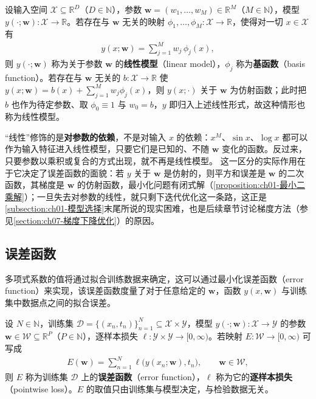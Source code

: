 \documentclass[../../main.tex]{subfiles}
\begin{document}
\begin{definition}[线性模型]\label{definition:ch01-线性模型}
设输入空间 $\mathcal{X}\subseteq\mathbb{R}^{D}$（$D\in\mathbb{N}$），参数 $\mathbf{w}=(w_1,\dots,w_{M})\in\mathbb{R}^{M}$（$M\in\mathbb{N}$），模型 $y(\cdot;\mathbf{w}):\mathcal{X}\to\mathbb{R}$。若存在与 $\mathbf{w}$ 无关的映射 $\phi_1,\dots,\phi_{M}:\mathcal{X}\to\mathbb{R}$，使得对一切 $x\in\mathcal{X}$ 有
\begin{align*}
  y(x;\mathbf{w})=\sum_{j=1}^{M}w_j\,\phi_j(x),
\end{align*}
则 $y(\cdot;\mathbf{w})$ 称为关于参数 $\mathbf{w}$ 的\textbf{线性模型}（linear model），$\phi_j$ 称为\textbf{基函数}（basis function）。若存在与 $\mathbf{w}$ 无关的 $b:\mathcal{X}\to\mathbb{R}$ 使 $y(x;\mathbf{w})=b(x)+\sum_{j=1}^{M}w_j\phi_j(x)$，则 $y(x;\cdot)$ 关于 $\mathbf{w}$ 为仿射函数；此时把 $b$ 也作为待定参数、取 $\phi_0\equiv1$ 与 $w_0=b$，$y$ 即归入上述线性形式，故这种情形也称为线性模型。
\end{definition}

\begin{remark}
“线性”修饰的是\textbf{对参数的依赖}，不是对输入 $x$ 的依赖：$x^M$、$\sin x$、$\log x$ 都可以作为输入特征进入线性模型，只要它们是已知的、不随 $\mathbf{w}$ 变化的函数。反过来，只要参数以乘积或复合的方式出现，就不再是线性模型。
这一区分的实际作用在于它决定了误差函数的面貌：若 $y$ 关于 $\mathbf{w}$ 是仿射的，则平方和误差是 $\mathbf{w}$ 的二次函数，其梯度是 $\mathbf{w}$ 的仿射函数，最小化问题有闭式解（\cref{proposition:ch01-最小二乘解}）；一旦失去对参数的线性，就只剩下迭代优化这一条路，这正是\cref{subsection:ch01-模型选择}末尾所说的现实困难，也是后续章节讨论梯度方法（参见\cref{section:ch07-梯度下降优化}）的原因。
\end{remark}

\subsection{误差函数}\label{subsection:ch01-误差函数}

多项式系数的值将通过拟合训练数据来确定，这可以通过最小化误差函数（error function）来实现，该误差函数度量了对于任意给定的 $\mathbf{w}$，函数 $y(x,\mathbf{w})$ 与训练集中数据点之间的拟合误差。

\begin{definition}[误差函数]\label{definition:ch01-误差函数}
设 $N\in\mathbb{N}$，训练集 $\mathcal{D}=\{(x_n,t_n)\}_{n=1}^{N}\subseteq\mathcal{X}\times\mathcal{Y}$，模型 $y(\cdot;\mathbf{w}):\mathcal{X}\to\mathcal{Y}$ 的参数 $\mathbf{w}\in\mathcal{W}\subseteq\mathbb{R}^{P}$（$P\in\mathbb{N}$），逐样本损失 $\ell:\mathcal{Y}\times\mathcal{Y}\to[0,\infty)$。若映射 $E:\mathcal{W}\to[0,\infty)$ 可写成
\begin{align*}
  E(\mathbf{w})=\sum_{n=1}^{N}\ell\bigl(y(x_n;\mathbf{w}),t_n\bigr),\qquad \mathbf{w}\in\mathcal{W},
\end{align*}
则 $E$ 称为训练集 $\mathcal{D}$ 上的\textbf{误差函数}（error function），$\ell$ 称为它的\textbf{逐样本损失}（pointwise loss）。$E$ 的取值只由训练集与模型决定，与检验数据无关。
\end{definition}
\end{document}
